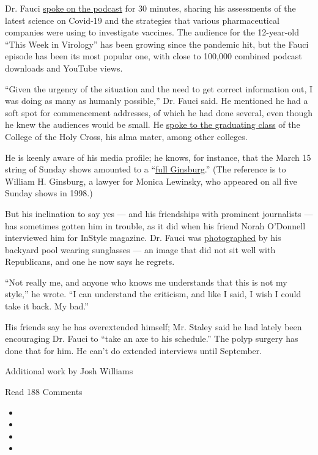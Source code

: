 Dr. Fauci \href{https://bit.ly/3fznojs}{spoke on the podcast} for 30
minutes, sharing his assessments of the latest science on Covid-19 and
the strategies that various pharmaceutical companies were using to
investigate vaccines. The audience for the 12-year-old ``This Week in
Virology'' has been growing since the pandemic hit, but the Fauci
episode has been its most popular one, with close to 100,000 combined
podcast downloads and YouTube views.

``Given the urgency of the situation and the need to get correct
information out, I was doing as many as humanly possible,'' Dr. Fauci
said. He mentioned he had a soft spot for commencement addresses, of
which he had done several, even though he knew the audiences would be
small. He
\href{https://www.holycross.edu/commencement/virtual-celebration?utm_source=facebook\&utm_medium=socialmedia\&utm_campaign=2020virtualcelebration}{spoke
to the graduating class} of the College of the Holy Cross, his alma
mater, among other colleges.

He is keenly aware of his media profile; he knows, for instance, that
the March 15 string of Sunday shows amounted to a
``\href{https://www.politico.com/gallery/the-full-ginsburg?slide=0}{full
Ginsburg}.'' (The reference is to William H. Ginsburg, a lawyer for
Monica Lewinsky, who appeared on all five Sunday shows in 1998.)

But his inclination to say yes --- and his friendships with prominent
journalists --- has sometimes gotten him in trouble, as it did when his
friend Norah O'Donnell interviewed him for InStyle magazine. Dr. Fauci
was
\href{https://www.instyle.com/news/dr-fauci-says-with-all-due-modesty-i-think-im-pretty-effective}{photographed}
by his backyard pool wearing sunglasses --- an image that did not sit
well with Republicans, and one he now says he regrets.

``Not really me, and anyone who knows me understands that this is not my
style,'' he wrote. ``I can understand the criticism, and like I said, I
wish I could take it back. My bad.''

His friends say he has overextended himself; Mr. Staley said he had
lately been encouraging Dr. Fauci to ``take an axe to his schedule.''
The polyp surgery has done that for him. He can't do extended interviews
until September.

Additional work by Josh Williams

Read 188 Comments

\begin{itemize}
\item
\item
\item
\item
\end{itemize}

